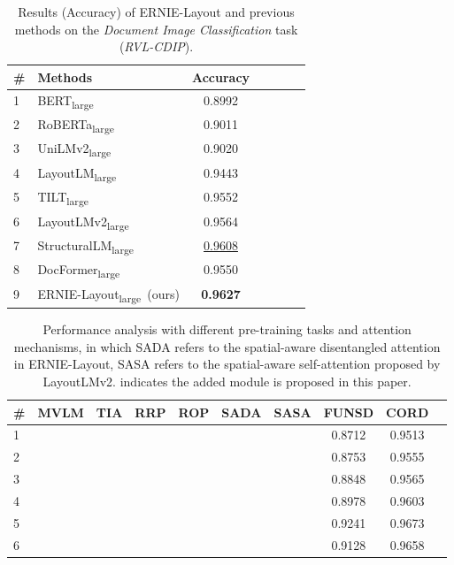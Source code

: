 \documentclass[11pt]{article}
\begin{document}
\begin{table}[t]
\centering
\small
\begin{tabular}{llccccc}
\toprule
\# & \textbf{Methods}                    & \textbf{Accuracy} \\
\midrule
1 & BERT\textsubscript{large} \cite{liu2019roberta} & 0.8992 \\
2 & RoBERTa\textsubscript{large} \cite{liu2019roberta} & 0.9011 \\
3 & UniLMv2\textsubscript{large} \cite{bao2020unilmv2} & 0.9020 \\
\midrule
4 & LayoutLM\textsubscript{large} \cite{xu2020layoutlm} & 0.9443 \\
5 & TILT\textsubscript{large} \cite{powalski2021going}  &  0.9552 \\
6 & LayoutLMv2\textsubscript{large} \cite{xu2021layoutlmv2} & 0.9564 \\
7 & StructuralLM\textsubscript{large} \cite{li2021structurallm} & \underline{0.9608} \\
8 & DocFormer\textsubscript{large}~\cite{appalaraju2021docformer} & 0.9550 \\
\midrule
\midrule
9 & ERNIE-Layout\textsubscript{large}~(ours) & \textbf{0.9627} \\ 
\bottomrule
\end{tabular}
\caption{Results (Accuracy) of ERNIE-Layout and previous methods on the \emph{Document Image Classification} task (\emph{RVL-CDIP}).}
\label{tab:main_result_document_classification}
\end{table}


\begin{table*}[ht]
\centering
\small
\begin{tabular}{lccccccccc}
\toprule
\# &\textbf{MVLM} &\textbf{TIA} &\textbf{RRP} &\textbf{ROP} & \textbf{SADA} & \textbf{SASA} & \textbf{FUNSD} & \textbf{CORD} \\
\midrule
1   &  &  &  &  &  &  & 0.8712 &0.9513 \\
2   &  &  &  &  &  &  & 0.8753 &0.9555\\
\midrule
3   &  &  &  &  &  &  & 0.8848 & 0.9565\\
4   &  &  &  &  &  &  & 0.8978 &0.9603\\
5   &  &  &  &  &  & & 0.9241 &0.9673\\
\midrule
6   &  &  &  &  & &  & 0.9128 &0.9658\\
\bottomrule
\end{tabular}
\caption{Performance analysis with different pre-training tasks and attention mechanisms, in which SADA refers to the spatial-aware disentangled attention in ERNIE-Layout, SASA refers to the spatial-aware self-attention proposed by LayoutLMv2.  indicates the added module is proposed in this paper.} 
\label{tab:ablation_staudy}
\end{table*}
\end{document}
